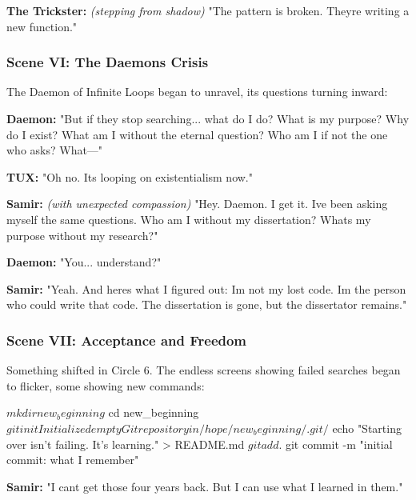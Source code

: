 \textbf{The Trickster:} \emph{(stepping from shadow)} "The pattern is broken. They\textquotesingle re writing a new function."

\bookdivider

\subsubsection{Scene VI: The Daemon\textquotesingle s Crisis}\label{scene-vi-the-daemons-crisis}

The Daemon of Infinite Loops began to unravel, its questions turning inward:

\textbf{Daemon:} "But if they stop searching... what do I do? What is my purpose? Why do I exist? What am I without the eternal question? Who am I if not the one who asks? What---"

\textbf{TUX:} "Oh no. It\textquotesingle s looping on existentialism now."

\textbf{Samir:} \emph{(with unexpected compassion)} "Hey. Daemon. I get it. I\textquotesingle ve been asking myself the same questions. \textquotesingle Who am I without my dissertation? What\textquotesingle s my purpose without my research?\textquotesingle"

\textbf{Daemon:} "You... understand?"

\textbf{Samir:} "Yeah. And here\textquotesingle s what I figured out: I\textquotesingle m not my lost code. I\textquotesingle m the person who could write that code. The dissertation is gone, but the dissertator remains."

\bookdivider

\subsubsection{Scene VII: Acceptance and Freedom}\label{scene-vii-acceptance-and-freedom}

Something shifted in Circle 6. The endless screens showing failed searches began to flicker, some showing new commands:

\begin{codeblock}
$ mkdir new_beginning
$ cd new_beginning
$ git init
Initialized empty Git repository in /hope/new_beginning/.git/
$ echo "Starting over isn't failing. It's learning." > README.md
$ git add .
$ git commit -m "initial commit: what I remember"
\end{codeblock}

\textbf{Samir:} "I can\textquotesingle t get those four years back. But I can use what I learned in them."

